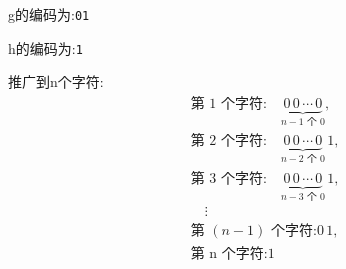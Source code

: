\documentclass[../../main.tex]{subfiles}
\begin{document}
\begin{solution}
g的编码为:\verb|01|

h的编码为:\verb|1|

推广到n个字符:
\[
\begin{aligned}
&\text{第 1 个字符:} \quad \underbrace{0 \, 0 \, \cdots \, 0}_{n-1 \text{ 个 0}}, \\
&\text{第 2 个字符:} \quad \underbrace{0 \, 0 \, \cdots \, 0}_{n-2 \text{ 个 0}} \, 1, \\
&\text{第 3 个字符:} \quad \underbrace{0 \, 0 \, \cdots \, 0}_{n-3 \text{ 个 0}} \, 1, \\
&\quad \vdots \\
&\text{第 } (n-1) \text{ 个字符:}  0 \, 1, \\
&\text{第 n 个字符:}  1
\end{aligned}
\]
\end{solution}
\end{document}
